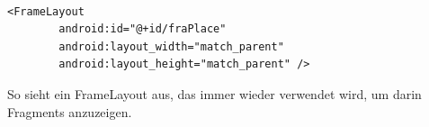\documentclass[FIPLY_base.tex]{subfiles}
\begin{document}
\ \\
\begin{lstlisting}[caption={Die Definition eines FrameLayouts in einem Layout XML File},label=DescriptiveLabel]
<FrameLayout
        android:id="@+id/fraPlace"
        android:layout_width="match_parent"
        android:layout_height="match_parent" />
\end{lstlisting}
So sieht ein FrameLayout aus, das immer wieder verwendet wird, um darin Fragments anzuzeigen.

\end{document}
